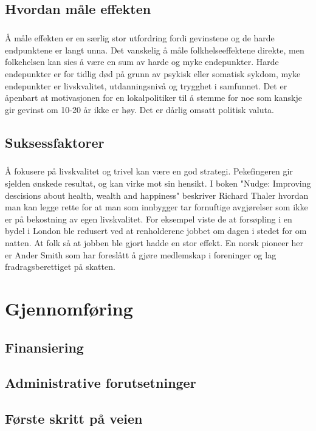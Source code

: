 \documentclass[11pt]{memoir} %
\begin{document}
	\section{Hvordan måle effekten}
		\paragraph{}
			Å måle effekten er en særlig stor utfordring fordi gevinstene og de harde endpunktene er langt unna. Det vanskelig å måle folkhelseeffektene direkte, men folkehelsen kan sies å være en sum av harde og myke endepunkter. Harde endepunkter er for tidlig død på grunn av psykisk eller somatisk sykdom, myke endepunkter er livskvalitet, utdanningsnivå og trygghet i samfunnet. Det er åpenbart at motivasjonen for en lokalpolitiker til å stemme for noe som kanskje gir gevinst om 10-20 år ikke er høy. Det er dårlig omsatt politisk valuta. 
	\section{Suksessfaktorer}
		\paragraph{}
			Å fokusere på livskvalitet og trivel kan være en god strategi. Pekefingeren gir sjelden ønskede resultat, og kan virke mot sin hensikt. I boken "Nudge: Improving descisions about health, wealth and happiness"\cite{!!!} beskriver Richard Thaler hvordan man kan legge rette for at man som innbygger tar fornuftige avgjørelser som ikke er på bekostning av egen livskvalitet. For eksempel viste de at forsøpling i en bydel i London ble redusert ved at renholderene jobbet om dagen i stedet for om natten\cite{!!!}. At folk så at jobben ble gjort hadde en stor effekt. En norsk pioneer her er Ander Smith som har foreslått å gjøre medlemskap i foreninger og lag fradragsberettiget på skatten\cite{!!!}.


\chapter{Gjennomføring}
	\section{Finansiering}
	\section{Administrative forutsetninger}
	\section{Første skritt på veien}
\end{document}
